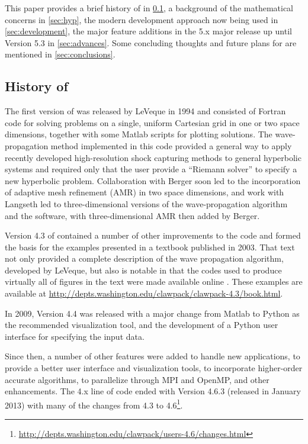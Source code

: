 This paper provides a brief history of \clawpack in
\cref{sub:history}, a background of the mathematical concerns in \cref{sec:hyp},
the modern development approach now being used in \cref{sec:development},
the major feature additions in the \clawpack 5.x major release up until Version 5.3 in
\cref{sec:advances}. Some concluding thoughts and future plans for
\clawpack are mentioned in
\cref{sec:conclusions}.

\subsection{History of \clawpack} \label{sub:history}

The first version of \clawpack was released by LeVeque in 1994
\cite{clawpack-v1} and consisted of Fortran code for solving problems on a
single, uniform Cartesian
grid in one or two space dimensions, together with some Matlab
\cite{MATLAB:2015a} scripts
for plotting solutions. The wave-propagation method implemented
in this code provided a general way to apply recently developed
high-resolution shock capturing methods to general hyperbolic systems and
required only that the user provide a ``Riemann solver'' to specify a new
hyperbolic problem.
Collaboration with Berger \cite{mjb-rjl:amrclaw}
soon led to the incorporation of adaptive mesh refinement (AMR) in two space
dimensions, and work with Langseth \cite{jol-rjl:3d, jol:thesis}
led to three-dimensional versions of the wave-propagation algorithm and the
software, with three-dimensional AMR then added by Berger.

Version 4.3 of \clawpack contained a number of other improvements to
the code and formed the basis for the examples presented in a textbook
\cite{rjl:fvmhp} published in 2003.  That text not only provided a
complete description of the wave propagation algorithm, developed by LeVeque,
but also is notable in that the codes used to produce virtually all of figures
in the text were made available online \cite{rjl:fvmhp}.  These examples are
available at \url{http://depts.washington.edu/clawpack/clawpack-4.3/book.html}.

In 2009, \clawpack Version 4.4 was released with a major change from Matlab
to Python as the recommended visualization tool, and the development
of a Python user interface for specifying the input data.

Since then, a number of other features were added to handle new applications, to
provide a better user interface and visualization tools, to incorporate
higher-order accurate algorithms, to parallelize through MPI and OpenMP, and
other enhancements. The \clawpack 4.x line of code ended with Version 4.6.3
(released in January 2013) with many of the changes from 4.3 to 4.6\footnote{
\url{http://depts.washington.edu/clawpack/users-4.6/changes.html}}.

